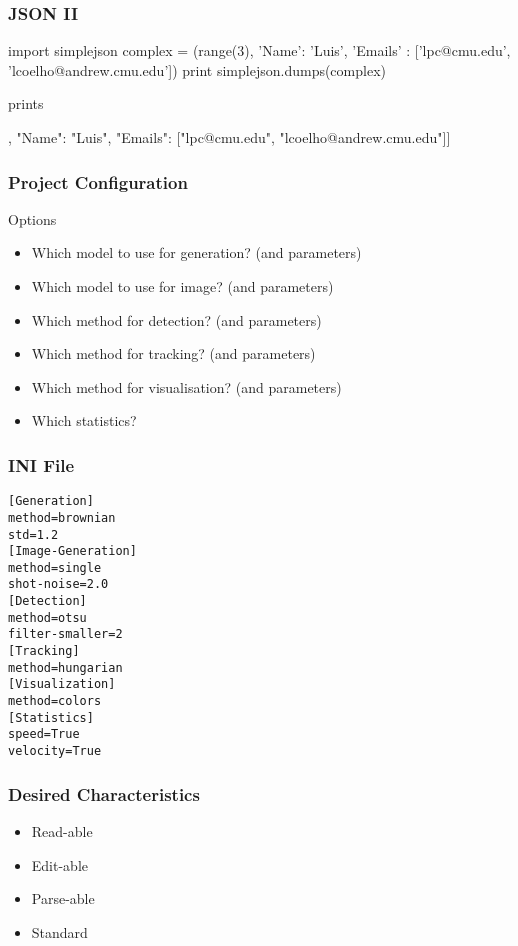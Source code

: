 \begin{frame}[fragile]
\frametitle{JSON II}
\begin{python}
import simplejson
complex = (range(3),
            {'Name': 'Luis',
            'Emails' : ['lpc@cmu.edu',
                    'lcoelho@andrew.cmu.edu']})
print simplejson.dumps(complex)
\end{python}
prints 
\begin{python}
[[0, 1, 2], 
    {"Name": "Luis",
    "Emails": ["lpc@cmu.edu", "lcoelho@andrew.cmu.edu"]}]
\end{python}
\end{frame}

\begin{frame}[fragile]
\frametitle{Project Configuration}

\begin{block}{Options}
\begin{itemize}
\item Which model to use for generation? (and parameters)
\item Which model to use for image? (and parameters)
\item Which method for detection? (and parameters)
\item Which method for tracking? (and parameters)
\item Which method for visualisation? (and parameters)
\item Which statistics?
\end{itemize}
\end{block}

\end{frame}

\begin{frame}[fragile]
\frametitle{INI File}
\begin{verbatim}
[Generation]
method=brownian
std=1.2
[Image-Generation]
method=single
shot-noise=2.0
[Detection]
method=otsu
filter-smaller=2
[Tracking]
method=hungarian
[Visualization]
method=colors
[Statistics]
speed=True
velocity=True
\end{verbatim}
\end{frame}

\begin{frame}[fragile]
\frametitle{Desired Characteristics}

\begin{itemize}
\item Read-able
\item Edit-able
\item Parse-able
\item Standard
\end{itemize}

\end{frame}

